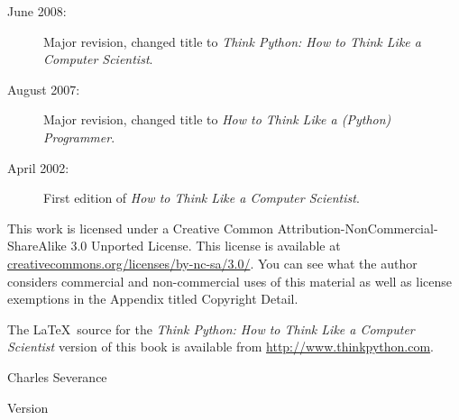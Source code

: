 \begin{latexonly}
{\begin{description}
\item[June 2008:] Major revision, changed title to
\emph{Think Python: How to Think Like
a Computer Scientist}.

\item[August 2007:] Major revision, changed title to
\emph{How to Think Like a (Python) Programmer}.

\item[April 2002:] First edition of \emph{How to Think Like
a Computer Scientist}.

\end{description}

\vspace{0.2in}

This work is licensed under a 
Creative Common
Attribution-NonCommercial-ShareAlike 3.0 Unported License.
This license is 
available at
\url{creativecommons.org/licenses/by-nc-sa/3.0/}.  You can 
see what the author considers commercial and non-commercial
uses of this material as well as license exemptions 
in the Appendix titled Copyright Detail.

The \LaTeX\ source for the 
\emph{Think Python: How to Think Like
a Computer Scientist}
version of this book is available from
\url{http://www.thinkpython.com}.

\vspace{0.2in}

} %

\end{latexonly}



\begin{htmlonly}


{\Large \thetitle}

{\large 
Charles Severance}

Version \theversion

\setcounter{chapter}{-1}

\end{htmlonly}
